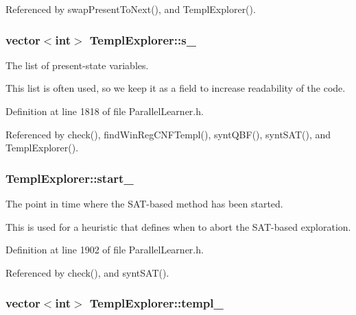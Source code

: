 Referenced by swap\-Present\-To\-Next(), and Templ\-Explorer().

\hypertarget{classTemplExplorer_afcddd3d7d156b0a8e8bc5d077245bd21}{
\subsubsection[{s\-\_\-}]{\setlength{\rightskip}{0pt plus 5cm}vector$<$int$>$ Templ\-Explorer\-::s\-\_\-\hspace{0.3cm}{\ttfamily [protected]}}}\label{classTemplExplorer_afcddd3d7d156b0a8e8bc5d077245bd21}


The list of present-\/state variables. 

This list is often used, so we keep it as a field to increase readability of the code. 

Definition at line 1818 of file Parallel\-Learner.\-h.



Referenced by check(), find\-Win\-Reg\-C\-N\-F\-Templ(), synt\-Q\-B\-F(), synt\-S\-A\-T(), and Templ\-Explorer().

\hypertarget{classTemplExplorer_aa22a33001341d2557a0cc66dea2ac890}{
\subsubsection[{start\-\_\-}]{ Templ\-Explorer\-::start\-\_\-\hspace{0.3cm}{\ttfamily [protected]}}}\label{classTemplExplorer_aa22a33001341d2557a0cc66dea2ac890}


The point in time where the S\-A\-T-\/based method has been started. 

This is used for a heuristic that defines when to abort the S\-A\-T-\/based exploration. 

Definition at line 1902 of file Parallel\-Learner.\-h.



Referenced by check(), and synt\-S\-A\-T().

\hypertarget{classTemplExplorer_ae3dcf416014ff2ec4120abbd9fba5149}{
\subsubsection[{templ\-\_\-}]{\setlength{\rightskip}{0pt plus 5cm}vector$<$int$>$ Templ\-Explorer\-::templ\-\_\-\hspace{0.3cm}{\ttfamily [protected]}}}\label{classTemplExplorer_ae3dcf416014ff2ec4120abbd9fba5149}


